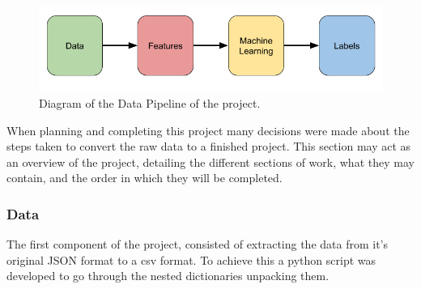 \documentclass{article}
\begin{document}
\begin{figure}[ht!]
    \centering
    \includegraphics[scale=0.5]{Images/Data-Pipeline.png}
    \caption{Diagram of the Data Pipeline of the project.}
    \label{fig:test}
\end{figure}

When planning and completing this project many decisions were made about the steps taken to convert the raw data to a finished project.
This section may act as an overview of the project, detailing the different sections of work, what they may contain, and the order in which they will be completed.



\subsubsection{Data}



The first component of the project, consisted of extracting the data from it's original JSON format to a csv format.
To achieve this a python script was developed to go through the nested dictionaries unpacking them.
\end{document}
